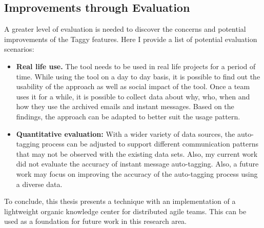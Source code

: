 \subsection{Improvements through Evaluation}
A greater level of evaluation is needed to discover the concerns and potential improvements of the Taggy features. Here I provide a list of potential evaluation scenarios:

\begin{itemize}
	\item \textbf{Real life use.} The tool needs to be used in real life projects for a period of time. While using the tool on a day to day basis, it is possible to find out the usability of the approach as well as social impact of the tool. Once a team uses it for a while, it is possible to collect data about why, who, when and how they use the archived emails and instant messages. Based on the findings, the approach can be adapted to better suit the usage pattern.
	
	\item \textbf{Quantitative evaluation:} With a wider variety of data sources, the auto-tagging process can be adjusted to support different communication patterns that may not be observed with the existing data sets. Also, my current work did not evaluate the accuracy of instant message auto-tagging. Also, a future work may focus on improving the accuracy of the auto-tagging process using a diverse data.	
\end{itemize}	

To conclude, this thesis presents a technique with an implementation of a lightweight organic knowledge center for distributed agile teams. This can be used as a foundation for future work in this research area.








